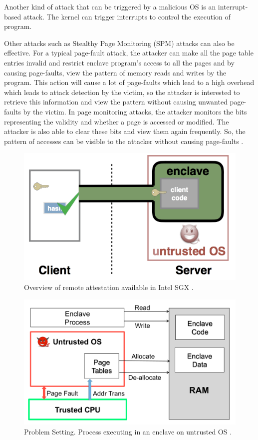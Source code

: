 Another kind of attack that can be triggered by a malicious OS is an interrupt-based attack. The kernel can trigger interrupts to control the execution of program.

Other attacks such as Stealthy Page Monitoring (SPM) attacks \cite{stealthy,leakycauldron} can also be effective. For a typical page-fault attack, the attacker can make all the page table entries invalid and restrict enclave program’s access to all the pages and by causing page-faults, view the pattern of memory reads and writes by the program. This action will cause a lot of page-faults which lead to a high overhead which leads to attack detection by the victim, so the attacker is interested to retrieve this information and view the pattern without causing unwanted page-faults by the victim. In page monitoring attacks, the attacker monitors the bits representing the validity and whether a page is accessed or modified. The attacker is also able to clear these bits and view them again frequently. So, the pattern of accesses can be visible to the attacker without causing page-faults \cite{stealthy,leakycauldron}.

\begin{figure}
	\includegraphics[scale=0.3]{images/uos}
	\caption{Overview of remote attestation available in Intel SGX \cite{wang2017}.}
	\label{fig:uos}
\end{figure}

\begin{figure}
	\includegraphics[scale=0.3]{images/uos1}
	\caption{Problem Setting. Process executing in an enclave on untrusted OS \cite{pigeonhole}.}
	\label{fig:uos}
\end{figure}

